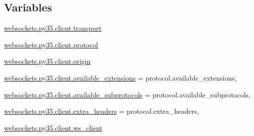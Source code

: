 \subsection*{Variables}
\begin{DoxyCompactItemize}
\item 
\hyperlink{namespacewebsockets_1_1py35_1_1client_a99393a72a9a76e791d48c6acef0c6bb5}{websockets.\+py35.\+client.\+transport}
\item 
\hyperlink{namespacewebsockets_1_1py35_1_1client_a9c731ec14cd0cbc624165a2bd8f83c0e}{websockets.\+py35.\+client.\+protocol}
\item 
\hyperlink{namespacewebsockets_1_1py35_1_1client_aed4e5ee87a7c438456b2ab085ee61de6}{websockets.\+py35.\+client.\+origin}
\item 
\hyperlink{namespacewebsockets_1_1py35_1_1client_a4f43ea5f65a1abf3f722ec8b09f00ea0}{websockets.\+py35.\+client.\+available\+\_\+extensions} = protocol.\+available\+\_\+extensions,
\item 
\hyperlink{namespacewebsockets_1_1py35_1_1client_a6436d8ab326c450bb2a1e0283d792389}{websockets.\+py35.\+client.\+available\+\_\+subprotocols} = protocol.\+available\+\_\+subprotocols,
\item 
\hyperlink{namespacewebsockets_1_1py35_1_1client_a2aebb975c78917934e240d989928f164}{websockets.\+py35.\+client.\+extra\+\_\+headers} = protocol.\+extra\+\_\+headers,
\item 
\hyperlink{namespacewebsockets_1_1py35_1_1client_abfc4d319f559916c23b487466f0a5de6}{websockets.\+py35.\+client.\+ws\+\_\+client}
\end{DoxyCompactItemize}
